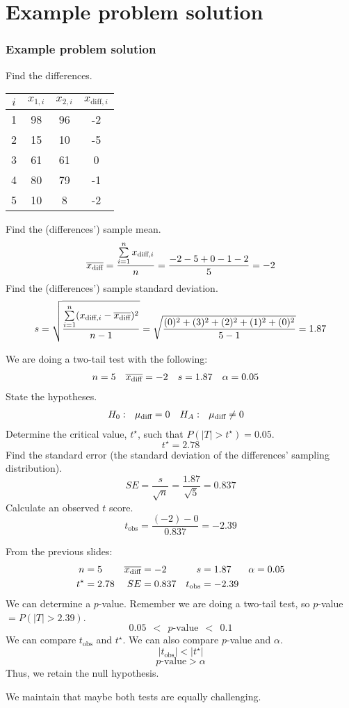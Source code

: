 \documentclass[slidestop,compress,mathserif]{beamer}
\begin{document}
\section{Example problem solution}
\begin{frame}
\frametitle{Example problem solution}
Find the differences. \pause
\begin{center}
\begin{tabular}{|c|c|c|c|} \hline
$i$    & $x_{1,i}$ & $x_{2,i}$ & $x_{\text{diff},i}$ \\ \hline
1   & 98     & 96     & -2\\  
2   & 15     & 10     & -5\\  
3   & 61     & 61     &  0\\  
4   & 80     & 79     & -1\\  
5   & 10     & 8      & -2\\  \hline
\end{tabular}
\end{center} \pause
Find the (differences') sample mean. \pause
$$\overline{x_\text{diff}} = \frac{\sum\limits_{i=1}^n x_{\text{diff},i}}{n} = \frac{-2-5+0-1-2}{5} = -2 $$ \pause
Find the (differences') sample standard deviation. \pause
$$s = \sqrt{\frac{\sum\limits_{i=1}^n (x_{\text{diff},i}-\overline{x_\text{diff}})^2}{n-1}} = \sqrt{\frac{(0)^2+(3)^2+(2)^2+(1)^2+(0)^2}{5-1}} = 1.87 $$
\end{frame}


\begin{frame}
We are doing a two-tail test with the following:
\begin{align*}
n &=5 & \overline{x_\text{diff}} &= -2 & s&= 1.87 & \alpha &= 0.05
\end{align*} \pause
State the hypotheses. \pause
\begin{align*}
H_0&:~~ \mu_\text{diff} = 0 & H_A&:~~ \mu_\text{diff} \ne 0
\end{align*} \pause
Determine the critical value, $t^\star$, such that $P(|T|>t^\star) = 0.05$. \pause
$$t^\star = 2.78 $$ \pause
Find the standard error (the standard deviation of the differences' sampling distribution). \pause
$$SE = \frac{s}{\sqrt{n}} = \frac{1.87}{\sqrt{5}} = 0.837 $$ \pause
Calculate an observed $t$ score. \pause
$$t_\text{obs} = \frac{(-2)-0}{0.837} = -2.39 $$
\end{frame}

\begin{frame}
From the previous slides:
\begin{align*}
n &=5 & \overline{x_\text{diff}} &= -2 & s&= 1.87 & \alpha &= 0.05 \\
t^\star &= 2.78 & SE &= 0.837 & t_\text{obs} &= -2.39
\end{align*} \pause
We can determine a $p$-value. Remember we are doing a two-tail test, so $p$-value $= P(|T|>2.39)$.\pause
$$0.05 ~~<~~ p\text{-value} ~~<~~ 0.1  $$\pause
We can compare $t_\text{obs}$ and $t^\star$. We can also compare $p$-value and $\alpha$.\pause
$$|t_\text{obs}| < |t^\star| $$\pause
$$p\text{-value} > \alpha $$\pause
Thus, we retain the null hypothesis. \pause
\begin{center}
We maintain that maybe both tests are equally challenging.
\end{center}
\end{frame}
\end{document}
